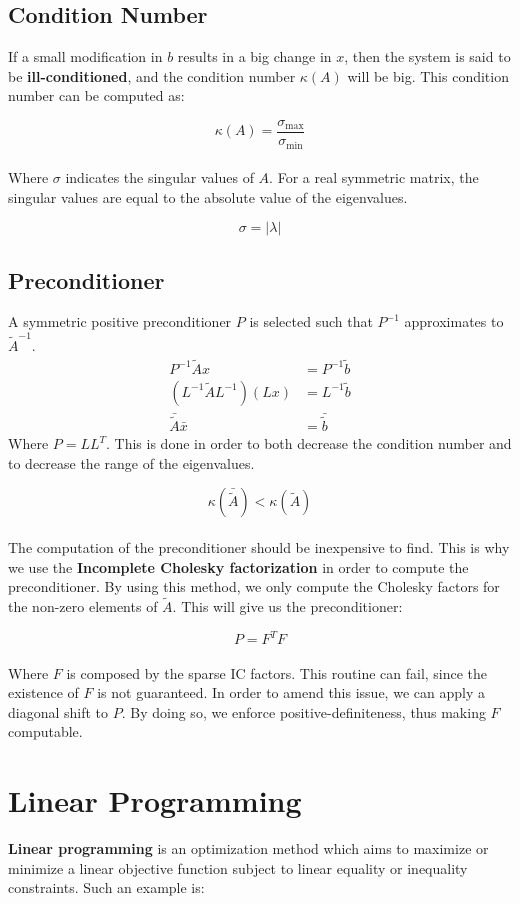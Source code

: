 \documentclass{article}
\begin{document}
\subsection{Condition Number}
If a small modification in $b$ results in a big change in $x$, then the system is said to be \textbf{ill-conditioned}, and the condition number $\kappa(A)$ will be big. This condition number can be computed as:

\[ \kappa(A) = \frac{\sigma_{\max}}{\sigma_{\min}} \] \\
Where $\sigma$ indicates the singular values of $A$. For a real symmetric matrix, the singular values are equal to the absolute value of the eigenvalues.

\[ \sigma = |\lambda| \]

\subsection{Preconditioner}
A symmetric positive preconditioner $P$ is selected such that $P^{-1}$ approximates to $\tilde{A}^{-1}$.
\begin{align*}
	P^{-1}\tilde{A}x & = P^{-1}\tilde{b} \\
	(L^{-1}\tilde{A}L^{-1})(Lx) & = L^{-1}\tilde{b} \\
	\bar{\tilde{A}}\bar{x} & = \bar{\tilde{b}}
\end{align*}
Where $P = LL^T$. This is done in order to both decrease the condition number and to decrease the range of the eigenvalues.

\[ \kappa(\bar{\tilde{A}}) < \kappa(\tilde{A}) \] \\
The computation of the preconditioner should be inexpensive to find. This is why we use the \textbf{Incomplete Cholesky factorization} in order to compute the preconditioner. By using this method, we only compute the Cholesky factors for the non-zero elements of $\tilde{A}$. This will give us the preconditioner:

\[ P = F^TF \] \\
Where $F$ is composed by the sparse IC factors. This routine can fail, since the existence of $F$ is not guaranteed. In order to amend this issue, we can apply a diagonal shift to $P$. By doing so, we enforce positive-definiteness, thus making $F$ computable.

\section{Linear Programming}
\textbf{Linear programming} is an optimization method which aims to maximize or minimize a linear objective function subject to linear equality or inequality constraints. Such an example is:
\end{document}
